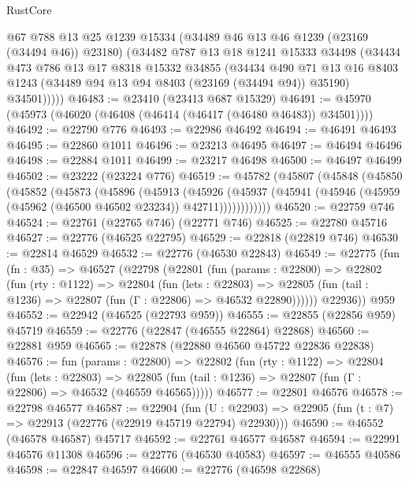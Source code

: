 \begin{lexlean}{RustCore}
\begin{coremodule}
        @67
        @788
        @13
        @25
        @1239
        @15334
        (@34489 @46 @13 @46 @1239 (@23169 (@34494 @46)) @23180)
        (@34482
          @787
          @13
          @18
          @1241
          @15333
          @34498
          (@34434
            @473
            @786
            @13
            @17
            @8318
            @15332
            @34855
            (@34434
              @490
              @71
              @13
              @16
              @8403
              @1243
              (@34489 @94 @13 @94 @8403 (@23169 (@34494 @94)) @35190)
              @34501)))))
@46483 := @23410 (@23413 @687 @15329)
@46491 := @45970 (@45973 (@46020 (@46408 (@46414 (@46417 (@46480 @46483)) @34501))))
@46492 := @22790 @776
@46493 := @22986 @46492
@46494 := @46491 @46493
@46495 := @22860 @1011
@46496 := @23213 @46495
@46497 := @46494 @46496
@46498 := @22884 @1011
@46499 := @23217 @46498
@46500 := @46497 @46499
@46502 := @23222 (@23224 @776)
@46519 := @45782
    (@45807
      (@45848
        (@45850
          (@45852
            (@45873
              (@45896
                (@45913
                  (@45926
                    (@45937
                      (@45941 (@45946 (@45959 (@45962 (@46500 @46502 @23234)) @42711))))))))))))
@46520 := @22759 @746
@46524 := @22761 (@22765 @746) (@22771 @746)
@46525 := @22780 @45716
@46527 := @22776 (@46525 @22795)
@46529 := @22818 (@22819 @746)
@46530 := @22814 @46529
@46532 := @22776 (@46530 @22843)
@46549 := @22775
    (fun (fn : @35) =>
    @46527
      (@22798
        (@22801
          (fun (params : @22800) =>
          @22802
            (fun (rty : @1122) =>
            @22804
              (fun (lets : @22803) =>
              @22805 (fun (tail : @1236) => @22807 (fun (Γ : @22806) => @46532 @22890))))))
        @22936))
    @959
@46552 := @22942 (@46525 (@22793 @959))
@46555 := @22855 (@22856 @959) @45719
@46559 := @22776 (@22847 (@46555 @22864) @22868)
@46560 := @22881 @959
@46565 := @22878 (@22880 @46560 @45722 @22836 @22838)
@46576 := fun (params : @22800) =>
  @22802
    (fun (rty : @1122) =>
    @22804
      (fun (lets : @22803) =>
      @22805 (fun (tail : @1236) => @22807 (fun (Γ : @22806) => @46532 (@46559 @46565)))))
@46577 := @22801 @46576
@46578 := @22798 @46577
@46587 := @22904
    (fun (U : @22903) => @22905 (fun (t : @7) => @22913 (@22776 (@22919 @45719 @22794) @22930)))
@46590 := @46552 (@46578 @46587) @45717
@46592 := @22761 @46577 @46587
@46594 := @22991 @46576 @11308
@46596 := @22776 (@46530 @40583)
@46597 := @46555 @40586
@46598 := @22847 @46597
@46600 := @22776 (@46598 @22868)

\end{coremodule}
\end{lexlean}
